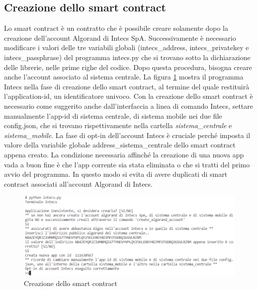 \subsection{Creazione dello smart contract}\label{creazione_smart_contract}
Lo smart contract è un contratto che è possibile creare solamente dopo la creazione dell'account Algorand di Intecs SpA. Successivamente è necessario modificare i valori delle tre variabili globali (intecs\_address, intecs\_privatekey e intecs\_passphrase) del programma intecs.py che si trovano sotto la dichiarazione delle librerie, nelle prime righe del codice. Dopo questa procedura, bisogna creare anche l'account associato al sistema centrale. La figura \ref{fig: intecs_create_smart_contract_} mostra il programma Intecs nella fase di creazione dello smart contract, al termine del quale restituirà l'application-id, un identificatore univoco. Con la creazione dello smart contract è necessario come suggerito anche dall'interfaccia a linea di comando Intecs, settare manualmente l'app-id di sistema centrale, di sistema mobile nei due file config.json, che si trovano rispettivamente nella cartella \textit{sistema\_centrale} e \textit{sistema\_mobile}. La fase di opt-in dell'account Intecs è cruciale perché imposta il valore della variabile globale address\_sistema\_centrale dello smart contract appena creato. La condizione necessaria affinché la creazione di una nuova app vada a buon fine è che l'app corrente sia stata eliminata o che si tratti del primo avvio del programma. In questo modo si evita di avere duplicati di smart contract associati all'account Algorand di Intecs.
\begin{figure}[!h]
\centering
\includegraphics[scale=0.8]{images/Intecs/creazione_smartcontract.png}
\caption{Creazione dello smart contract}
\label{fig: intecs_create_smart_contract_}
\end{figure}

